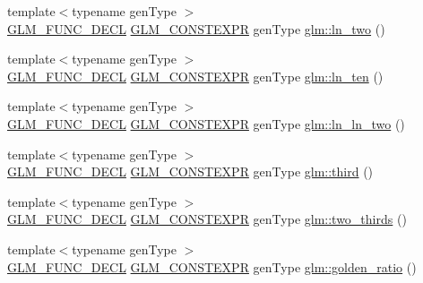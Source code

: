 \begin{DoxyCompactItemize}
\item 
{\footnotesize template$<$typename gen\+Type $>$ }\\\hyperlink{setup_8hpp_ab2d052de21a70539923e9bcbf6e83a51}{G\+L\+M\+\_\+\+F\+U\+N\+C\+\_\+\+D\+E\+CL} \hyperlink{setup_8hpp_a08b807947b47031d3a511f03f89645ad}{G\+L\+M\+\_\+\+C\+O\+N\+S\+T\+E\+X\+PR} gen\+Type \hyperlink{group__gtc__constants_ga24f4d27765678116f41a2f336ab7975c}{glm\+::ln\+\_\+two} ()
\item 
{\footnotesize template$<$typename gen\+Type $>$ }\\\hyperlink{setup_8hpp_ab2d052de21a70539923e9bcbf6e83a51}{G\+L\+M\+\_\+\+F\+U\+N\+C\+\_\+\+D\+E\+CL} \hyperlink{setup_8hpp_a08b807947b47031d3a511f03f89645ad}{G\+L\+M\+\_\+\+C\+O\+N\+S\+T\+E\+X\+PR} gen\+Type \hyperlink{group__gtc__constants_gaf97ebc6c059ffd788e6c4946f71ef66c}{glm\+::ln\+\_\+ten} ()
\item 
{\footnotesize template$<$typename gen\+Type $>$ }\\\hyperlink{setup_8hpp_ab2d052de21a70539923e9bcbf6e83a51}{G\+L\+M\+\_\+\+F\+U\+N\+C\+\_\+\+D\+E\+CL} \hyperlink{setup_8hpp_a08b807947b47031d3a511f03f89645ad}{G\+L\+M\+\_\+\+C\+O\+N\+S\+T\+E\+X\+PR} gen\+Type \hyperlink{group__gtc__constants_gaca94292c839ed31a405ab7a81ae7e850}{glm\+::ln\+\_\+ln\+\_\+two} ()
\item 
{\footnotesize template$<$typename gen\+Type $>$ }\\\hyperlink{setup_8hpp_ab2d052de21a70539923e9bcbf6e83a51}{G\+L\+M\+\_\+\+F\+U\+N\+C\+\_\+\+D\+E\+CL} \hyperlink{setup_8hpp_a08b807947b47031d3a511f03f89645ad}{G\+L\+M\+\_\+\+C\+O\+N\+S\+T\+E\+X\+PR} gen\+Type \hyperlink{group__gtc__constants_ga3077c6311010a214b69ddc8214ec13b5}{glm\+::third} ()
\item 
{\footnotesize template$<$typename gen\+Type $>$ }\\\hyperlink{setup_8hpp_ab2d052de21a70539923e9bcbf6e83a51}{G\+L\+M\+\_\+\+F\+U\+N\+C\+\_\+\+D\+E\+CL} \hyperlink{setup_8hpp_a08b807947b47031d3a511f03f89645ad}{G\+L\+M\+\_\+\+C\+O\+N\+S\+T\+E\+X\+PR} gen\+Type \hyperlink{group__gtc__constants_ga9b4d2f4322edcf63a6737b92a29dd1f5}{glm\+::two\+\_\+thirds} ()
\item 
{\footnotesize template$<$typename gen\+Type $>$ }\\\hyperlink{setup_8hpp_ab2d052de21a70539923e9bcbf6e83a51}{G\+L\+M\+\_\+\+F\+U\+N\+C\+\_\+\+D\+E\+CL} \hyperlink{setup_8hpp_a08b807947b47031d3a511f03f89645ad}{G\+L\+M\+\_\+\+C\+O\+N\+S\+T\+E\+X\+PR} gen\+Type \hyperlink{group__gtc__constants_ga748cf8642830657c5b7eae04d0a80899}{glm\+::golden\+\_\+ratio} ()
\end{DoxyCompactItemize}


